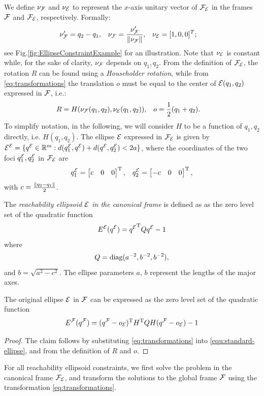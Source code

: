 \documentclass[journal]{IEEEtran}  %
\begin{document}
  We define $\nu_{\mathcal{F}}$ and $\nu_{\mathcal{E}}$ to represent the $x$-axis unitary vector of $\mathcal{F}_{\mathcal{E}}$ in the frames $\mathcal{F}$ and $\mathcal{F}_{\mathcal{E}}$, respectively. Formally:
  \begin{align}
    \nu'_{\mathcal{F}}&=q_2-q_1, & \nu_{\mathcal{F}} &= \frac{\nu'_{\mathcal{F}}}{\lVert\nu_{\mathcal{F}}\rVert}, & \nu_{\mathcal{E}}&=[1,0,0]^T;
  \end{align}
  see Fig.\ref{fig:EllipseConstraintExample} for an illustration. Note that $\nu_{\mathcal{E}}$ is constant while, for the sake of clarity, $\nu_{\mathcal{F}}$ depends on $q_1,q_2$. From the definition of $\mathcal{F}_{\mathcal{E}}$, the rotation $R$ can be found using a \emph{Householder rotation}, while from \eqref{eq:transformations} the translation $o$ must be equal to the center of $\mathcal{E}(q_1,q_2)$ expressed in $\mathcal{F}$, i.e.:
  \begin{align} 
    R&=H(\nu_{\mathcal{F}}(q_1,q_2),\nu_{\mathcal{E}}(q_1,q_2)), &o&=\frac{1}{2}(q_1+q_2).
  \end{align}
  To simplify notation, in the following, we will consider $H$ to be a function of $q_1,q_2$ directly, i.e. $H(q_1,q_2)$. 
  The ellipse $\mathcal{E}$ expressed in $\mathcal{F}_{\mathcal{E}}$ is given by ${\mathcal{E}^{\mathcal{E}}}=\{{q^{\mathcal{E}}}\in\mathbb{R}^{m}{}:d(q^{\mathcal{E}}_1,{q^{\mathcal{E}}})+d({q^{\mathcal{E}}},q^{\mathcal{E}}_2)<2a\}$, where the coordinates of the two foci $q^{\mathcal{E}}_1,q^{\mathcal{E}}_2$ in $\mathcal{F}_{\mathcal{E}}$ are
  \begin{align}
    q^{\mathcal{E}}_1=\begin{bmatrix}c & 0 & 0\end{bmatrix}^\mathrm{T}, && q^{\mathcal{E}}_2=\begin{bmatrix}-c & 0 & 0\end{bmatrix}^\mathrm{T},
  \end{align}
  with $c=\frac{\lVert q_2-q_1\rVert}{2}$.
\begin{definition}
  The \emph{reachability ellipsoid $\mathcal{E}$ in the canonical frame} is defined as as the zero level set of the quadratic function
  \begin{equation}\label{equ:standard-ellipse}
    {E^{\mathcal{E}}}({q^{\mathcal{E}}}) = {q^{\mathcal{E}}}^\mathrm{T} Q {q^{\mathcal{E}}} - 1
  \end{equation}
  where
  \begin{equation}
    Q = \operatorname{diag}(a^{-2},b^{-2},b^{-2}),
  \end{equation}
  and $b = \sqrt{a^2-c^2}$.
  The ellipse parameters $a$, $b$ represent the lengths of the major axes.
\end{definition}
\begin{lemma}
The original ellipse $\mathcal{E}$ in $\mathcal{F}$ can be expressed as the zero level set of the quadratic function
   \begin{equation}\label{eq:ellpsoid from canonical}
     {E^{\mathcal{F}}}({q^{\mathcal{F}}}) = ({q^{\mathcal{F}}}-o_{\mathcal{E}})^\mathrm{T} H^\mathrm{T} Q H ({q^{\mathcal{F}}}-o_{\mathcal{E}}) - 1
     \end{equation}
\end{lemma}
\begin{proof}
    The claim follows by substituting  \eqref{eq:transformations} into \eqref{equ:standard-ellipse}, and from the definition of $R$ and $o$.
\end{proof}
For all reachability ellipsoid constraints, we first solve the problem in the canonical frame $\mathcal{F}_{\mathcal{E}}$, and transform the solutions to the global frame $\mathcal{F}$ using the transformation \eqref{eq:transformations}.
\end{document}
